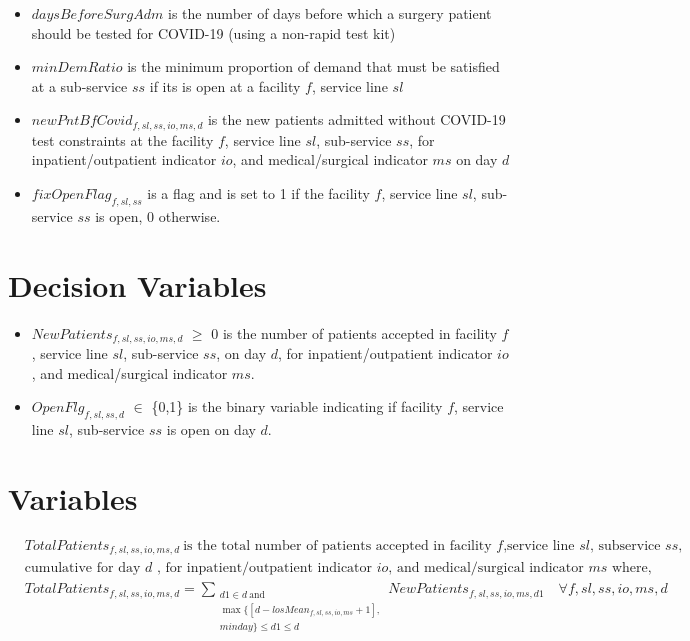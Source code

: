\documentclass[10pt, letterpaper]{article}
\begin{document}
\begin{itemize}
\item[ ] $daysBeforeSurgAdm$ is the number of days before which a surgery patient should be tested for COVID-19 (using a non-rapid test kit) 
\item[ ] $minDemRatio$ is the minimum proportion of demand that must be satisfied at a sub-service $ss$ if its is open at a facility $f$, service line $sl$ 
\item[ ] $newPntBfCovid_{f,sl,ss,io,ms,d}$ is the new patients admitted without COVID-19 test constraints at the facility $f$, service line $sl$, sub-service $ss$, for inpatient/outpatient indicator $io$, and medical/surgical indicator $ms$ on day $d$ 
\item[ ] $fixOpenFlag_{f,sl,ss}$ is a flag and is set to 1 if the facility $f$, service line $sl$, sub-service $ss$ is open, 0 otherwise. 
\end{itemize}

\section*{Decision Variables}
\begin{itemize}
\item [ ] $NewPatients_{f,sl,ss,io,ms,d}$ $\geq$ {0} is the number of patients accepted in facility $f$, service line $sl$, sub-service $ss$, on day $d$, for inpatient/outpatient indicator $io$, and medical/surgical indicator $ms$.
\item [ ] $OpenFlg_{f,sl,ss,d}$ $\in$ \{0,1\} is the binary variable indicating if facility $f$, service line $sl$, sub-service $ss$ is open on day $d$.
\end{itemize}

\section*{Variables}
\begin{align*}
&TotalPatients_{f,sl,ss,io,ms,d} \ \text{is the total number of patients accepted in facility $f$,service line $sl$, subservice $ss$,} \\
&\text{cumulative for day $d$ , for inpatient/outpatient indicator $io$, and medical/surgical indicator $ms$ where,} \\
&TotalPatients_{f,sl,ss,io,ms,d} =
\sum_{\substack{d1 \in d \ \text{and} \\
\max \{[d - losMean_{f,sl,ss,io,ms} + 1], \\ minday \} \leq d1 \leq d}}  NewPatients_{f,sl,ss,io,ms,d1} \quad \forall f,sl,ss,io,ms,d\ \\
\end{align*}
\end{document}
